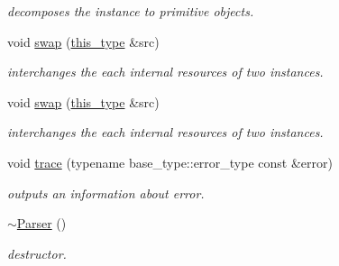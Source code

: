 \begin{DoxyCompactItemize}
\begin{DoxyCompactList}\small\item\em decomposes the instance to primitive objects. \end{DoxyCompactList}\item 
\hypertarget{classhryky_1_1parser_1_1_base_ab2b137d16fbe40d839ee136bd5304cab}{void \hyperlink{classhryky_1_1parser_1_1_base_ab2b137d16fbe40d839ee136bd5304cab}{swap} (\hyperlink{classhryky_1_1uri_1_1_parser_ab16d652331f3a9386278bacd77c167ec}{this\-\_\-type} \&src)}\label{classhryky_1_1parser_1_1_base_ab2b137d16fbe40d839ee136bd5304cab}

\begin{DoxyCompactList}\small\item\em interchanges the each internal resources of two instances. \end{DoxyCompactList}\item 
\hypertarget{classhryky_1_1uri_1_1_parser_ab7d04ede969f278b22483225b16a884e}{void \hyperlink{classhryky_1_1uri_1_1_parser_ab7d04ede969f278b22483225b16a884e}{swap} (\hyperlink{classhryky_1_1uri_1_1_parser_ab16d652331f3a9386278bacd77c167ec}{this\-\_\-type} \&src)}\label{classhryky_1_1uri_1_1_parser_ab7d04ede969f278b22483225b16a884e}

\begin{DoxyCompactList}\small\item\em interchanges the each internal resources of two instances. \end{DoxyCompactList}\item 
\hypertarget{classhryky_1_1parser_1_1_base_a28bfa66d197bcf4babb3806bcf3abafa}{void \hyperlink{classhryky_1_1parser_1_1_base_a28bfa66d197bcf4babb3806bcf3abafa}{trace} (typename base\-\_\-type\-::error\-\_\-type const \&error)}\label{classhryky_1_1parser_1_1_base_a28bfa66d197bcf4babb3806bcf3abafa}

\begin{DoxyCompactList}\small\item\em outputs an information about error. \end{DoxyCompactList}\item 
\hypertarget{classhryky_1_1uri_1_1_parser_afc3e4f4f2075eeebb02273ce5c41a280}{\hyperlink{classhryky_1_1uri_1_1_parser_afc3e4f4f2075eeebb02273ce5c41a280}{$\sim$\-Parser} ()}\label{classhryky_1_1uri_1_1_parser_afc3e4f4f2075eeebb02273ce5c41a280}

\begin{DoxyCompactList}\small\item\em destructor. \end{DoxyCompactList}\end{DoxyCompactItemize}
